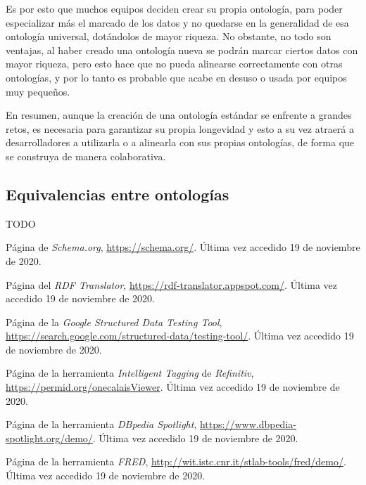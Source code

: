\documentclass[11pt]{article}
\begin{document}
Es por esto que muchos equipos deciden crear su propia ontología, para poder especializar más el marcado de los datos y no quedarse en la generalidad de esa ontología universal, dotándolos de mayor riqueza. No obstante, no todo son ventajas, al haber creado una ontología nueva se podrán marcar ciertos datos con mayor riqueza, pero esto hace que no pueda alinearse correctamente con otras ontologías, y por lo tanto es probable que acabe en desuso o usada por equipos muy pequeños.

En resumen, aunque la creación de una ontología estándar se enfrente a grandes retos, es necesaria para garantizar su propia longevidad y esto a su vez atraerá a desarrolladores a utilizarla o a alinearla con sus propias ontologías, de forma que se construya de manera colaborativa.

\subsection{Equivalencias entre ontologías}
TODO
\begin{thebibliography}{8}
Página de \textit{Schema.org}, \url{https://schema.org/}. Última vez accedido 19 de noviembre de 2020.        

Página del \textit{RDF Translator}, \url{https://rdf-translator.appspot.com/}. Última vez accedido 19 de noviembre de 2020.

Página de la \textit{Google Structured Data Testing Tool}, \url{https://search.google.com/structured-data/testing-tool/}. Última vez accedido 19 de noviembre de 2020.

Página de la herramienta \textit{Intelligent Tagging} de \textit{Refinitiv}, \url{https://permid.org/onecalaisViewer}. Última vez accedido 19 de noviembre de 2020.

Página de la herramienta \textit{DBpedia Spotlight}, \url{https://www.dbpedia-spotlight.org/demo/}. Última vez accedido 19 de noviembre de 2020.

Página de la herramienta \textit{FRED}, \url{http://wit.istc.cnr.it/stlab-tools/fred/demo/}. Última vez accedido 19 de noviembre de 2020.
\end{thebibliography}
\end{document}
